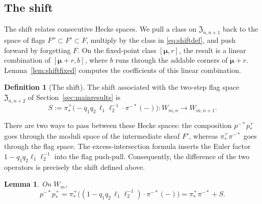 \documentclass[11pt]{amsart}
\newtheorem{lemma}[theorem]{Lemma}
\theoremstyle{definition}
\newtheorem{definition}[theorem]{Definition}
\theoremstyle{remark}
\newcommand{\bmu}{{\boldsymbol{\mu}}}
\newcommand{\Wdeg}[2]{W_{#1,#2}}                 %
\newcommand{\Zc}{\mathfrak Z}
\newcommand{\Hecke}[1]{\Zc_{#1,#1+1}}            %
\newcommand{\HeckeTwo}[1]{\Zc_{#1,#1+2}}         %
\newcommand{\Sh}{F}                              %
\newcommand{\Wsp}[1]{W_{#1}}                     %
\newcommand{\pt}[2]{[#1,#2]}                     %
\newcommand{\tautone}{\ell_1}
\newcommand{\tauttwo}{\ell_2}
\newcommand{\pulm}{p^{-*}}                       %
\newcommand{\pushp}{p^+_*}                       %
\newcommand{\pimpull}{\pi^{-*}}                  %
\newcommand{\pippush}{\pi^+_*}                   %
\newcommand{\Shift}{S}                           %
\begin{document}
\subsection{The shift}\label{sec:shift}

The shift relates consecutive Hecke spaces. We pull a class on
\(\Hecke{n}\) back to the space of flags \(\Sh''\subset\Sh'\subset\Sh\),
multiply by the class in \eqref{eq:shiftdef}, and push forward by forgetting
\(\Sh\). On the fixed-point class \(\pt{\bmu}{r}\), the result is a linear combination
of \(\pt{\bmu+r}{b}\), where \(b\) runs through the addable corners of \(\bmu+r\).
Lemma~\ref{lem:shiftfixed} computes the coefficients of this linear combination.

\begin{definition}[The shift]\label{def:shift}
The shift associated with the two-step flag space
\(\HeckeTwo{n}\) of Section~\ref{sec:mainresults} is
\begin{equation}\label{eq:shiftdef}
 \Shift:=\pippush\bigl(-q_1q_2\,\tautone\tauttwo^{-1}\cdot\pimpull(-)\bigr)
 \colon\Wdeg{m}{n}\longrightarrow\Wdeg{m}{n+1}.
\end{equation}
\end{definition}

There are two ways to pass between these Hecke spaces: the composition
\(\pulm\pushp\) goes through the moduli space of the intermediate sheaf \(\Sh'\),
whereas \(\pippush\pimpull\) goes through the flag space.
The excess-intersection formula inserts the Euler factor
\(1-q_1q_2\tautone\tauttwo^{-1}\) into the flag push-pull.
Consequently, the difference of the two operators is precisely the shift defined above.

\begin{lemma}\label{lem:excess}
On \(\Wsp{m}\),
\[
 \pulm\pushp
 =\pippush\bigl((1-q_1q_2\,\tautone\tauttwo^{-1})\cdot\pimpull(-)\bigr)
 =\pippush\pimpull+\Shift.
\]
\end{lemma}
\end{document}
